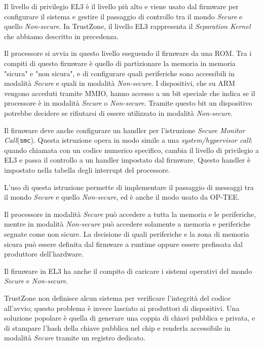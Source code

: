 \documentclass[12pt,italian]{report}
\begin{document}
Il livello di privilegio EL3 è il livello più alto e viene usato dal firmware
per configurare il sistema e gestire il passaggio di controllo tra il mondo
\emph{Secure} e quello \emph{Non-secure}.
In TrustZone, il livello EL3 rappresenta il \emph{Separation Kernel}
che abbiamo descritto in precedenza.

Il processore si avvia in questo livello eseguendo il firmware da una ROM.
Tra i compiti di questo firmware è quello di partizionare la memoria in
memoria "sicura" e "non sicura", e di configurare quali periferiche sono
accessibili in modalità \emph{Secure} e quali in modalità \emph{Non-secure}.
I dispositivi, che su ARM vengono acceduti tramite MMIO, hanno accesso a un
bit speciale che indica se il processore è in modalità \emph{Secure} o
\emph{Non-secure}.
Tramite questo bit un dispositivo potrebbe decidere se
rifiutarsi di essere utilizzato in modalità \emph{Non-secure}. 

Il firmware deve anche configurare un handler per l'istruzione
\textit{Secure Monitor Call}(\texttt{smc}).
Questa istruzione opera in modo simile a una \textit{system/hypervisor call}:
quando chiamata con un codice numerico specifico, cambia il livello
di privilegio a EL3 e passa il controllo a un handler impostato dal firmware.
Questo handler è impostato nella tabella degli interrupt del processore.

L'uso di questa istruzione permette di implementare il passaggio
di messaggi tra il mondo \emph{Secure} e quello \emph{Non-secure}, ed è
anche il modo usato da OP-TEE.

Il processore in modalità \emph{Secure} può accedere a tutta la memoria
e le periferiche, mentre in modalità \emph{Non-secure} può accedere
solamente a memoria e periferiche segnate come non sicure.
La decisione di quali periferiche e la zona di memoria sicura può essere
definita dal firmware a runtime oppure essere prefissata dal produttore
dell'hardware.

\medbreak \noindent

Il firmware in EL3 ha anche il compito di caricare i sistemi operativi
del mondo \emph{Secure} e \emph{Non-secure}.

TrustZone non definisce alcun sistema per verificare l'integrità del codice
all'avvio; questo problema è invece lasciato ai produttori di dispositivi.
Una soluzione popolare è quella di generare una coppia di chiavi pubblica
e privata, e di stampare l'hash della chiave pubblica nel chip e renderla
accessibile in modalità \emph{Secure} tramite un registro dedicato.
\end{document}

